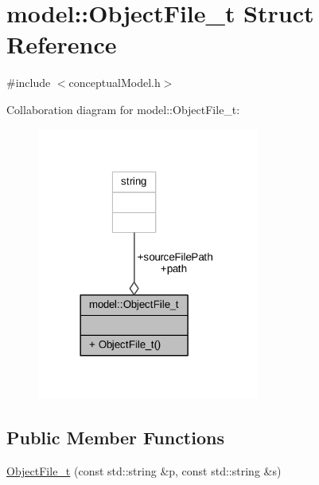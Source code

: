 \hypertarget{structmodel_1_1_object_file__t}{}\section{model\+:\+:Object\+File\+\_\+t Struct Reference}
\label{structmodel_1_1_object_file__t}


{\ttfamily \#include $<$conceptual\+Model.\+h$>$}



Collaboration diagram for model\+:\+:Object\+File\+\_\+t\+:
\nopagebreak
\begin{figure}[H]
\begin{center}
\leavevmode
\includegraphics[width=206pt]{structmodel_1_1_object_file__t__coll__graph}
\end{center}
\end{figure}
\subsection*{Public Member Functions}
\begin{DoxyCompactItemize}
\item 
\hyperlink{structmodel_1_1_object_file__t_a69b399baf3f5329f96362b63c35ffc40}{Object\+File\+\_\+t} (const std\+::string \&p, const std\+::string \&s)
\end{DoxyCompactItemize}
